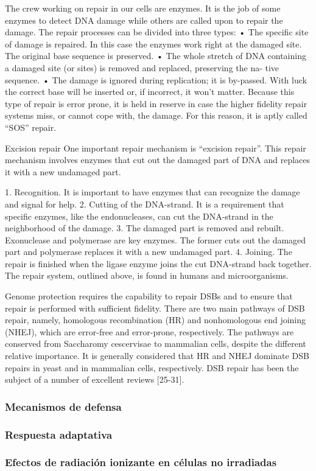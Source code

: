 The crew working on repair in our cells are enzymes. It is the job of some enzymes to detect DNA damage while others are called upon to repair the damage. The repair processes can be divided into three types:
• The specific site of damage is repaired. In this case the enzymes work right at the damaged site. The original base sequence is preserved.
• The whole stretch of DNA containing a damaged site (or sites) is removed and replaced, preserving the na- tive sequence.
• The damage is ignored during replication; it is by-passed. With luck the correct base will be inserted or, if incorrect, it won’t matter. Because this type of repair is error prone, it is held in reserve in case the higher fidelity repair systems miss, or cannot cope with, the damage. For this reason, it is aptly called “SOS” repair.

Excision repair
One important repair mechanism is “excision repair”. This repair mechanism involves enzymes that cut out the damaged part of DNA and replaces it with a new undamaged part.

1. Recognition. It is important to have enzymes that can recognize the damage and signal for help. 2. Cutting of the DNA-strand.
It is a requirement that specific enzymes, like the endonucleases, can cut the DNA-strand in the neighborhood of the damage.
3. The damaged part is removed and rebuilt. Exonuclease and polymerase are key enzymes. The former cuts out the damaged part and polymerase replaces it with a new undamaged part. 4. Joining. The repair is finished when the ligase enzyme joins the cut DNA-strand back together.
The repair system, outlined above, is found in humans and microorganisms.

Genome protection requires the capability to repair DSBs and to ensure that repair is performed with sufficient fidelity. There are two main pathways of DSB repair, namely, homologous recombination (HR) and nonhomologous end joining (NHEJ), which are error-free and error-prone, respectively. The pathways are conserved from Saccharomy cescervisae to mammalian
cells, despite the different relative importance. It is generally considered that HR and NHEJ dominate DSB repairs in yeast and in mammalian cells, respectively. DSB repair has been the subject of a number of excellent reviews [25-31].
\subsubsection{Mecanismos de defensa}

\subsubsection{Respuesta adaptativa}

\subsubsection{Efectos de radiación ionizante en células no irradiadas}
\cite{willmari}
